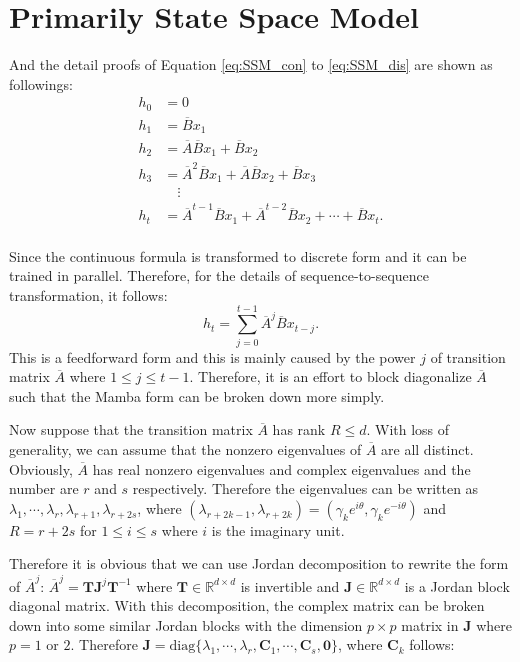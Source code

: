 \section{Primarily State Space Model}

 And the detail proofs of Equation \eqref{eq:SSM_con} to \eqref{eq:SSM_dis} are shown as followings:
\begin{equation}
\label{eq:SSM_Parallel}
    \begin{aligned}
        h_0 & = 0 \\
        h_1 & = \overline{B} x_1 \\
        h_2 & = \overline{A}\overline{B}x_1+\overline{B}x_2 \\
        h_3 & = \overline{A}^2\overline{B}x_1+\overline{A}\overline{B}x_2+\overline{B}x_3 \\
        & \quad \vdots \\
        h_t & = \overline{A}^{t-1}\overline{B}x_1 + \overline{A}^{t-2}\overline{B}x_2 + \cdots + \overline{B}x_t. \\
    \end{aligned}
\end{equation}

Since the continuous formula is transformed to discrete form and it can be trained in parallel. Therefore, for the details of sequence-to-sequence transformation, it follows:
\begin{equation}
\label{eq:SSM_formula}
    h_t = \sum_{j=0}^{t-1} \overline{A}^j \overline{B} x_{t-j}.
\end{equation}
This is a feedforward form and this is mainly caused by the power $j$ of transition matrix $\overline{A}$ where $1 \leq j \leq t-1$. Therefore, it is an effort to block diagonalize $\overline{A}$ such that the Mamba form can be broken down more simply.

Now suppose that the transition matrix $\overline{A}$ has rank $R \leq d$. With loss of generality, we can assume that the nonzero eigenvalues of $\overline{A}$ are all distinct. Obviously, $\overline{A}$ has real nonzero eigenvalues and complex eigenvalues and the number are $r$ and $s$ respectively. Therefore the eigenvalues can be written as $\lambda_1,\cdots,\lambda_r,\lambda_{r+1},\lambda_{r+2s}$, where $(\lambda_{r+2k-1},\lambda_{r+2k}) = (\gamma_k e^{i\theta},\gamma_k e^{-i\theta})$ and $R=r+2s$ for $1 \leq i \leq s$ where $i$ is the imaginary unit. 

Therefore it is obvious that we can use Jordan decomposition \citep{} to rewrite the form of $\overline{A}^j$: $\overline{A}^j = \boldsymbol{T J}^j \boldsymbol{T}^{-1}$ where $\boldsymbol{T} \in \mathbb{R}^{d \times d}$ is invertible and $\boldsymbol{J} \in \mathbb{R}^{d \times d}$ is a Jordan block diagonal matrix. With this decomposition, the complex matrix can be broken down into some similar Jordan blocks with the dimension $p \times p$ matrix in $\boldsymbol{J}$ where $p=1$ or $2$. Therefore $\boldsymbol{J} = \text{diag}\{\lambda_1,\cdots,\lambda_r,\boldsymbol{C}_1,\cdots,\boldsymbol{C}_s,\boldsymbol{0}\}$, where $\boldsymbol{C}_k$ follows:

